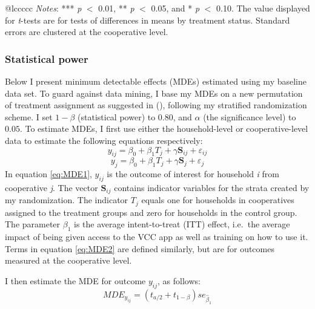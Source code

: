 \documentclass[11pt]{article}
\begin{document}
\begin{center}
\begin{table}[H]
{\begin{tabular}{@{\extracolsep{5pt}}lccccc}
\hline \hline
{\textit{Notes}:  *** \textit{p} $<$ 0.01, ** \textit{p} $<$ 0.05, and * \textit{p} $<$ 0.10. The value displayed for \textit{t}-tests are for tests of differences in means by treatment status. Standard errors are clustered at the cooperative level.}
\end{tabular}}
\end{table}
\end{center}
\doublespacing

\subsubsection{Statistical power} \label{sec:E3_power}

Below I present minimum detectable effects (MDEs) estimated using my baseline data set. To guard against data mining, I base my MDEs on a new permutation of treatment assignment as suggested in \citeauthor{olken15} (\citeyear{olken15}), following my stratified randomization scheme. I set $1-\beta$ (statistical power) to $0.80$, and $\alpha$ (the significance level) to $0.05$. To estimate MDEs, I first use either the household-level or cooperative-level data to estimate the following equations respectively:
\begin{equation} \label{eq:MDE1}
y_{ij} = \beta_{0} + \beta_{1} T_{j} + \gamma \textbf{S}_{ij} + \varepsilon_{ij}
\end{equation}
\begin{equation} \label{eq:MDE2}
y_{j} = \beta_{0} + \beta_{1} T_{j} + \gamma \textbf{S}_{j} + \varepsilon_{j}
\end{equation}
In equation \ref{eq:MDE1}, $y_{ij}$ is the outcome of interest for household \textit{i} from cooperative \textit{j}. The vector $\textbf{S}_{ij}$ contains indicator variables for the strata created by my randomization. The indicator $T_{j}$ equals one for households in cooperatives assigned to the treatment groups and zero for households in the control group. The parameter $\beta_{1}$ is the average intent-to-treat (ITT) effect, i.e.\ the average impact of being given access to the VCC app as well as training on how to use it. Terms in equation \ref{eq:MDE2} are defined similarly, but are for outcomes measured at the cooperative level. 

I then estimate the MDE for outcome \textit{$y_{ij}$}, as follows: 
\begin{equation} \label{eq:MDE3}
MDE_{y_{ij}} = (t_{a/2} + t_{1-\beta})se_{\hat{\beta}_1}
\end{equation}
\end{document}
